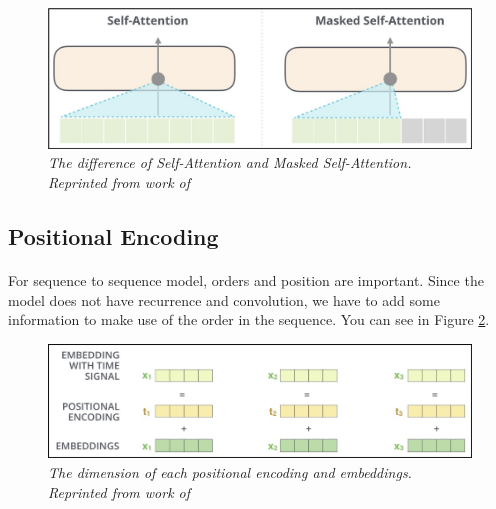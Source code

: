 \begin{figure}[H]
  \centering
  \caption[The difference of Self-Attention and Masked Self-Attention.]{\emph{The difference of Self-Attention and Masked Self-Attention. \\ Reprinted from work of \citeauthor{alammar_2019} \citeyear{alammar_2019}}}\label{fig:attention_6}
  \includegraphics[scale = 0.3]{figures/attention_6.jpg}  
\end{figure}
\subsection{Positional Encoding}
\paragraph{}
For sequence to sequence model, orders and position are important. Since the model does not have recurrence and convolution, we have to add some information to make use of the order in the sequence. You can see in Figure \ref{fig:attention_7}.

\begin{figure}[H]
  \centering
  \caption[The dimension of each positional encoding and embeddings.]{\emph{The dimension of each positional encoding and embeddings. \\ Reprinted from work of \citeauthor{alammar_2018} \citeyear{alammar_2018}}}\label{fig:attention_7}
  \includegraphics[scale = 0.4]{figures/attention_7.jpg}  
\end{figure}


\FloatBarrier